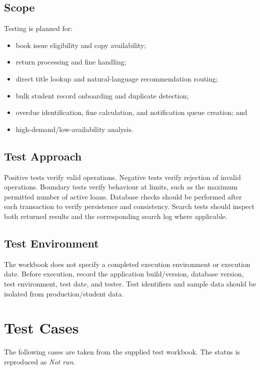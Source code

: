 \documentclass[12pt,a4paper]{report}
\begin{document}
\subsection{Scope}
Testing is planned for:
\begin{itemize}
\item book issue eligibility and copy availability;
\item return processing and fine handling;
\item direct title lookup and natural-language recommendation routing;
\item bulk student record onboarding and duplicate detection;
\item overdue identification, fine calculation, and notification queue creation; and
\item high-demand/low-availability analysis.
\end{itemize}

\subsection{Test Approach}
Positive tests verify valid operations. Negative tests verify rejection of invalid operations. Boundary tests verify behaviour at limits, such as the maximum permitted number of active loans. Database checks should be performed after each transaction to verify persistence and consistency. Search tests should inspect both returned results and the corresponding search log where applicable.

\subsection{Test Environment}
The workbook does not specify a completed execution environment or execution date. Before execution, record the application build/version, database version, test environment, test date, and tester. Test identifiers and sample data should be isolated from production/student data.

\section{Test Cases}
The following cases are taken from the supplied test workbook. The status is reproduced as \textit{Not run}.
\end{document}
